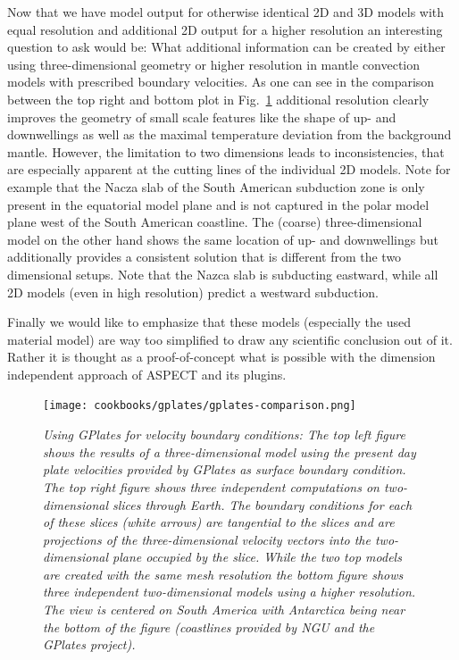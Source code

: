 \documentclass{article}
\newcommand{\aspect}{\textsc{ASPECT}}
\begin{document}
Now that we have model output for otherwise identical 2D and 3D models with equal resolution and additional 2D output
for a higher resolution an interesting question to ask would be: What additional information can be created by
either using three-dimensional geometry or higher resolution in mantle convection models with prescribed boundary velocities.
As one can see in the comparison between the top right and bottom plot in Fig.~\ref{fig:gv-1} additional resolution clearly
improves the geometry of small scale features like the shape of up- and downwellings as well as the maximal temperature
deviation from the background mantle. However, the limitation to two dimensions leads to inconsistencies, 
that are especially apparent at the cutting lines of the individual 2D models. 
Note for example that the Nacza slab of the South American subduction zone is only
present in the equatorial model plane and is not captured in the polar model plane west 
of the South American coastline. The (coarse) three-dimensional model on the other hand
shows the same location of up- and downwellings but additionally provides a consistent solution
that is different from the two dimensional setups. Note that the Nazca slab is subducting eastward,
while all 2D models (even in high resolution) predict a westward subduction.

Finally we would like to emphasize that these models (especially the used material model)
are way too simplified to draw any scientific conclusion out of it. Rather it is thought
as a proof-of-concept what is possible with the dimension independent approach of
\aspect{} and its plugins.

\begin{figure}
  \texttt{[image: cookbooks/gplates/gplates-comparison.png]}
  \hfill
  \caption{\it Using GPlates for velocity boundary conditions: The top left figure shows
  the results of a three-dimensional model using the present day plate velocities
  provided by GPlates as surface boundary condition. 
  The top right figure shows three independent computations 
  on two-dimensional slices through Earth. The boundary conditions for each of these slices (white
  arrows) are tangential to the slices and are projections of the
  three-dimensional velocity vectors into the two-dimensional plane
  occupied by the slice. While the two top models are created with the same mesh resolution
  the bottom figure shows three independent two-dimensional models using a higher resolution. 
  The view is centered on South America with Antarctica being near the bottom of
  the figure (coastlines provided by NGU and the GPlates project).}
  \label{fig:gv-1}
\end{figure}
\end{document}
